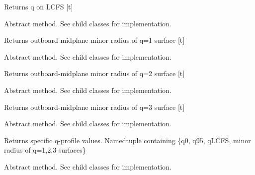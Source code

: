 \documentclass[letterpaper,10pt,english]{sphinxmanual}
\begin{document}
\begin{fulllineitems}
\begin{fulllineitems}
Returns q on LCFS {[}t{]}

\end{fulllineitems}


\begin{fulllineitems}
\label{eqtools:eqtools.core.Equilibrium.getQ1Surf}
Abstract method.  See child classes for implementation.

Returns outboard-midplane minor radius of q=1 surface {[}t{]}

\end{fulllineitems}


\begin{fulllineitems}
\label{eqtools:eqtools.core.Equilibrium.getQ2Surf}
Abstract method.  See child classes for implementation.

Returns outboard-midplane minor radius of q=2 surface {[}t{]}

\end{fulllineitems}


\begin{fulllineitems}
\label{eqtools:eqtools.core.Equilibrium.getQ3Surf}
Abstract method.  See child classes for implementation.

Returns outboard-midplane minor radius of q=3 surface {[}t{]}

\end{fulllineitems}


\begin{fulllineitems}
\label{eqtools:eqtools.core.Equilibrium.getQs}
Abstract method.  See child classes for implementation.

Returns specific q-profile values.
Namedtuple containing \{q0, q95, qLCFS, minor radius of q=1,2,3 surfaces\}

\end{fulllineitems}


\begin{fulllineitems}
\label{eqtools:eqtools.core.Equilibrium.getBtVac}
Abstract method.  See child classes for implementation.


\end{fulllineitems}
\end{fulllineitems}
\end{document}
